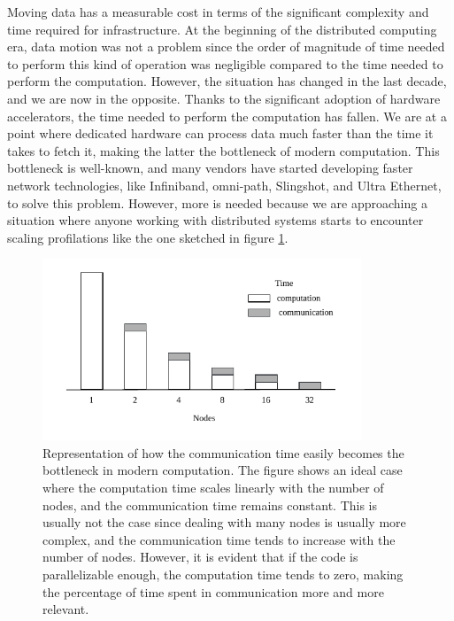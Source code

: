
Moving data has a measurable cost in terms of the significant complexity and
time required for infrastructure. At the beginning of the distributed computing
era, data motion was not a problem since the order of magnitude of time needed
to perform this kind of operation was negligible compared to the time needed to
perform the computation. However, the situation has changed in the last decade,
and we are now in the opposite. Thanks to the significant adoption of hardware
accelerators, the time needed to perform the computation has fallen. We are at a
point where dedicated hardware can process data much faster than the time it
takes to fetch it, making the latter the bottleneck of modern computation. This
bottleneck is well-known, and many vendors have started developing faster
network technologies, like Infiniband, omni-path, Slingshot, and Ultra Ethernet,
to solve this problem. However, more is needed because we are approaching a
situation where anyone working with distributed systems starts to encounter
scaling profilations like the one sketched in figure \ref{fig:scaling}.

\begin{figure}[h]
  \centering
  \includegraphics[width=0.85\textwidth]{img/chpt2/scaling}
  \caption{Representation of how the communication time easily becomes the
    bottleneck in modern computation. The figure shows an ideal case where
    the computation time scales linearly with the number of nodes, and the
    communication time remains constant. This is usually not the case since
    dealing with many nodes is usually more complex, and the
    communication time tends to increase with the number of nodes. However, it is
    evident that if the code is parallelizable enough, the computation time
    tends to zero, making the percentage of time spent in communication more and
    more relevant.}
  \label{fig:scaling}
\end{figure}


